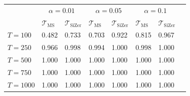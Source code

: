 \documentclass[12pt]{article}
\begin{document}
\begin{table}[t!]
{\begin{subtable}[b]{\textwidth}
\vspace{0.25cm} 
\begin{tabularx}{\textwidth}{l@{\hskip 20pt} Z@{\hskip 6pt}Z@{\hskip 20pt}Z@{\hskip 6pt}Z@{\hskip 6pt}Z@{\hskip 6pt}Z@{\hskip 20pt}Z}
\toprule
 &  &  & \\
 & $\mathcal{T}_{\text{MS}}$ & $\mathcal{T}_{\text{SiZer}}$   & $\mathcal{T}_{\text{MS}}$ & $\mathcal{T}_{\text{SiZer}}$ & $\mathcal{T}_{\text{MS}}$ & $\mathcal{T}_{\text{SiZer}}$\\
$T = 100$ & 0.482 & 0.733 & 0.703 & 0.922 & 0.815 & 0.967 \\ 
  $T = 250$ & 0.966 & 0.998 & 0.994 & 1.000 & 0.998 & 1.000 \\ 
  $T = 500$ & 1.000 & 1.000 & 1.000 & 1.000 & 1.000 & 1.000 \\ 
  $T = 750$ & 1.000 & 1.000 & 1.000 & 1.000 & 1.000 & 1.000 \\ 
  $T = 1000$ & 1.000 & 1.000 & 1.000 & 1.000 & 1.000 & 1.000 \\ 
\bottomrule
\end{tabularx}
\end{subtable}}
\end{table}
\end{document}
